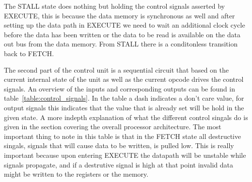 The STALL state does nothing but holding the control signals asserted by EXECUTE, this is because the data memory is synchronous as well and after setting up the data path in EXECUTE we need to wait an additional clock cycle before the data has been written or the data to be read is available on the data out bus from the data memory. From STALL there is a conditonless transition back to FETCH.

The second part of the control unit is a sequential circuit that based on the current internal state of the unit as well as the current opcode drives the control signals. An overview of the inputs and corresponding outputs can be found in table~\ref{table:control_signals}. In the table a dash indicates a don't care value, for output signals this indicates that the value that is already set will be hold in the given state. A more indepth explanation of what the different control singals do is given in the section covering the overall processor architecture. The most important thing to note in this table is that in the FETCH state all destructive singals, signals that will cause data to be written, is pulled low. This is really important because upon entering EXECUTE the datapath will be unstable while signals propagate, and if a destrutive signal is high at that point invalid data might be written to the registers or the memory. 


